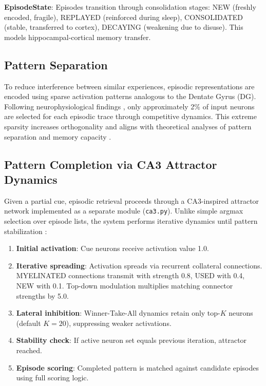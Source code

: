 \documentclass[11pt]{article}
\begin{document}
\textbf{EpisodeState}: Episodes transition through consolidation stages: NEW (freshly encoded, fragile), REPLAYED (reinforced during sleep), CONSOLIDATED (stable, transferred to cortex), DECAYING (weakening due to disuse). This models hippocampal-cortical memory transfer.

\subsection{Pattern Separation}

To reduce interference between similar experiences, episodic representations
are encoded using sparse activation patterns analogous to the Dentate Gyrus (DG).
Following neurophysiological findings \citep{rolls2007attractor}, only approximately
2\% of input neurons are selected for each episodic trace through competitive dynamics.
This extreme sparsity increases orthogonality and aligns with theoretical analyses
of pattern separation and memory capacity \citep{rolls2013mechanisms,treves1994computational}.

\subsection{Pattern Completion via CA3 Attractor Dynamics}

Given a partial cue, episodic retrieval proceeds through a CA3-inspired attractor network
implemented as a separate module (\texttt{ca3.py}). Unlike simple argmax selection over
episode lists, the system performs iterative dynamics until pattern stabilization
\citep{rolls2007attractor,rolls2013mechanisms}:

\begin{enumerate}
\item \textbf{Initial activation}: Cue neurons receive activation value 1.0.
\item \textbf{Iterative spreading}: Activation spreads via recurrent collateral connections.
      MYELINATED connections transmit with strength 0.8, USED with 0.4, NEW with 0.1.
      Top-down modulation multiplies matching connector strengths by 5.0.
\item \textbf{Lateral inhibition}: Winner-Take-All dynamics retain only top-$K$ neurons
      (default $K=20$), suppressing weaker activations.
\item \textbf{Stability check}: If active neuron set equals previous iteration, attractor reached.
\item \textbf{Episode scoring}: Completed pattern is matched against candidate episodes using
      full scoring logic.
\end{enumerate}
\end{document}
